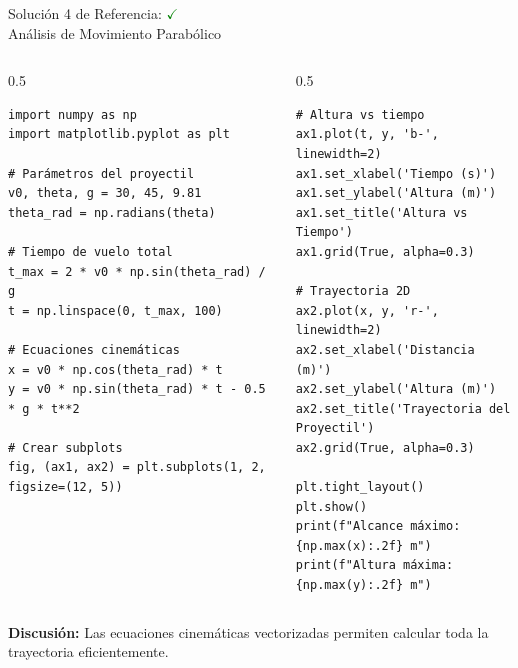 \documentclass[10pt]{beamer}
\begin{document}
\begin{frame}[fragile]{{\small Solución 4 de Referencia: \hfill \textcolor{green}{$\checkmark$} \\ Análisis de Movimiento Parabólico}}
\scriptsize
\begin{columns}[t]
\begin{column}{0.5\textwidth}
\begin{verbatim}
import numpy as np
import matplotlib.pyplot as plt

# Parámetros del proyectil
v0, theta, g = 30, 45, 9.81
theta_rad = np.radians(theta)

# Tiempo de vuelo total
t_max = 2 * v0 * np.sin(theta_rad) / g
t = np.linspace(0, t_max, 100)

# Ecuaciones cinemáticas
x = v0 * np.cos(theta_rad) * t
y = v0 * np.sin(theta_rad) * t - 0.5 * g * t**2

# Crear subplots
fig, (ax1, ax2) = plt.subplots(1, 2, figsize=(12, 5))
\end{verbatim}
\end{column}
\begin{column}{0.5\textwidth}
\begin{verbatim}
# Altura vs tiempo
ax1.plot(t, y, 'b-', linewidth=2)
ax1.set_xlabel('Tiempo (s)')
ax1.set_ylabel('Altura (m)')
ax1.set_title('Altura vs Tiempo')
ax1.grid(True, alpha=0.3)

# Trayectoria 2D
ax2.plot(x, y, 'r-', linewidth=2)
ax2.set_xlabel('Distancia (m)')
ax2.set_ylabel('Altura (m)')
ax2.set_title('Trayectoria del Proyectil')
ax2.grid(True, alpha=0.3)

plt.tight_layout()
plt.show()
print(f"Alcance máximo: {np.max(x):.2f} m")
print(f"Altura máxima: {np.max(y):.2f} m")
\end{verbatim}
\end{column}
\end{columns}
\vspace{0.15cm}
\textbf{Discusión:} Las ecuaciones cinemáticas vectorizadas permiten calcular toda la trayectoria eficientemente.
\end{frame}
\end{document}
